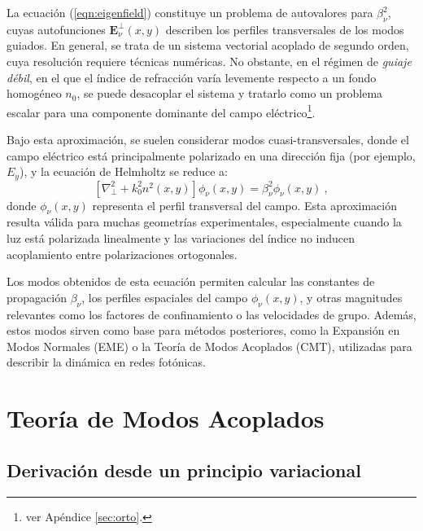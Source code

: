 La ecuación (\ref{eqn:eigenfield}) constituye un problema de autovalores para \( \beta_\nu^2 \), cuyas autofunciones \( \textbf{E}_\nu^\perp(x,y) \) describen los perfiles transversales de los modos guiados. En general, se trata de un sistema vectorial acoplado de segundo orden, cuya resolución requiere técnicas numéricas. No obstante, en el régimen de \textit{guiaje débil}, en el que el índice de refracción varía levemente respecto a un fondo homogéneo \( n_0 \), se puede desacoplar el sistema y tratarlo como un problema escalar para una componente dominante del campo eléctrico\footnote{ver Apéndice \ref{sec:orto}.}.

Bajo esta aproximación, se suelen considerar modos cuasi-transversales, donde el campo eléctrico está principalmente polarizado en una dirección fija (por ejemplo, \( E_y \)), y la ecuación de Helmholtz se reduce a:
\begin{equation}
	\left[\nabla_\perp^2 + k_0^2 n^2(x,y) \right] \phi_\nu(x,y) = \beta_\nu^2 \phi_\nu(x,y) \ ,
\end{equation}
donde \( \phi_\nu(x,y) \) representa el perfil transversal del campo. Esta aproximación resulta válida para muchas geometrías experimentales, especialmente cuando la luz está polarizada linealmente y las variaciones del índice no inducen acoplamiento entre polarizaciones ortogonales.

Los modos obtenidos de esta ecuación permiten calcular las constantes de propagación \( \beta_\nu \), los perfiles espaciales del campo \( \phi_\nu(x,y) \), y otras magnitudes relevantes como los factores de confinamiento o las velocidades de grupo. Además, estos modos sirven como base para métodos posteriores, como la Expansión en Modos Normales (EME) o la Teoría de Modos Acoplados (CMT), utilizadas para describir la dinámica en redes fotónicas.
\section{Teoría de Modos Acoplados \label{cap:CMTteo}}
\subsection{Derivación desde un principio variacional}

